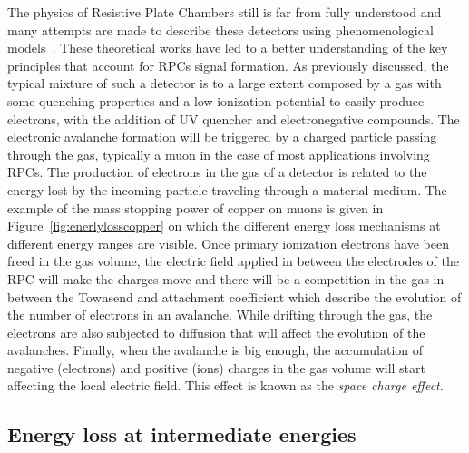 	The physics of Resistive Plate Chambers still is far from fully understood and many attempts are made to describe these detectors using phenomenological models~\cite{LIPPMANN2003,VINCENT2016,VINCENT2017}. These theoretical works have led to a better understanding of the key principles that account for RPCs signal formation. As previously discussed, the typical mixture of such a detector is to a large extent composed by a gas with some quenching properties and a low ionization potential to easily produce electrons, with the addition of UV quencher and electronegative compounds. The electronic avalanche formation will be triggered by a charged particle passing through the gas, typically a muon in the case of most applications involving RPCs. The production of electrons in the gas of a detector is related to the energy lost by the incoming particle traveling through a material medium. The example of the mass stopping power of copper on muons is given in Figure~\ref{fig:enerlylosscopper} on which the different energy loss mechanisms at different energy ranges are visible. Once primary ionization electrons have been freed in the gas volume, the electric field applied in between the electrodes of the RPC will make the charges move and there will be a competition in the gas in between the Townsend and attachment coefficient which describe the evolution of the number of electrons in an avalanche. While drifting through the gas, the electrons are also subjected to diffusion that will affect the evolution of the avalanches. Finally, when the avalanche is big enough, the accumulation of negative (electrons) and positive (ions) charges in the gas volume will start affecting the local electric field. This effect is known as the \textit{space charge effect}.
	
\newpage
	
	\subsection{Energy loss at intermediate energies}
	\label{chapt3:ssec:ElossBethe}
	
\begingroup\setlength{\intextsep}{0pt}\setlength{\columnsep}{15pt}
	

